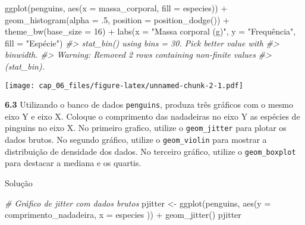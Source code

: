 \documentclass[
]{book}
\newenvironment{Shaded}{\begin{snugshade}}{\end{snugshade}}
\newcommand{\AttributeTok}[1]{\textcolor[rgb]{0.77,0.63,0.00}{#1}}
\newcommand{\CommentTok}[1]{\textcolor[rgb]{0.56,0.35,0.01}{\textit{#1}}}
\newcommand{\DecValTok}[1]{\textcolor[rgb]{0.00,0.00,0.81}{#1}}
\newcommand{\FunctionTok}[1]{\textcolor[rgb]{0.00,0.00,0.00}{#1}}
\newcommand{\NormalTok}[1]{#1}
\newcommand{\OtherTok}[1]{\textcolor[rgb]{0.56,0.35,0.01}{#1}}
\newcommand{\SpecialCharTok}[1]{\textcolor[rgb]{0.00,0.00,0.00}{#1}}
\newcommand{\StringTok}[1]{\textcolor[rgb]{0.31,0.60,0.02}{#1}}
\begin{document}
\begin{Shaded}
\begin{Highlighting}[]
\FunctionTok{ggplot}\NormalTok{(penguins, }\FunctionTok{aes}\NormalTok{(}\AttributeTok{x =}\NormalTok{ massa\_corporal, }\AttributeTok{fill =}\NormalTok{ especies)) }\SpecialCharTok{+}
  \FunctionTok{geom\_histogram}\NormalTok{(}\AttributeTok{alpha =}\NormalTok{ .}\DecValTok{5}\NormalTok{,  }\AttributeTok{position =} \FunctionTok{position\_dodge}\NormalTok{()) }\SpecialCharTok{+}
  \FunctionTok{theme\_bw}\NormalTok{(}\AttributeTok{base\_size =} \DecValTok{16}\NormalTok{) }\SpecialCharTok{+}
  \FunctionTok{labs}\NormalTok{(}\AttributeTok{x =} \StringTok{"Massa corporal (g)"}\NormalTok{,}
       \AttributeTok{y =} \StringTok{"Frequência"}\NormalTok{,}
       \AttributeTok{fill =} \StringTok{"Espécie"}\NormalTok{)}
\CommentTok{\#\textgreater{} \textasciigrave{}stat\_bin()\textasciigrave{} using \textasciigrave{}bins = 30\textasciigrave{}. Pick better value with}
\CommentTok{\#\textgreater{} \textasciigrave{}binwidth\textasciigrave{}.}
\CommentTok{\#\textgreater{} Warning: Removed 2 rows containing non{-}finite values}
\CommentTok{\#\textgreater{} (stat\_bin).}
\end{Highlighting}
\end{Shaded}

\texttt{[image: cap\_06\_files/figure-latex/unnamed-chunk-2-1.pdf]}

\textbf{6.3}
Utilizando o banco de dados \texttt{penguins}, produza três gráficos com o mesmo eixo Y e eixo X. Coloque o comprimento das nadadeiras no eixo Y as espécies de pinguins no eixo X. No primeiro grafico, utilize o \texttt{geom\_jitter} para plotar os dados brutos. No segundo gráfico, utilize o \texttt{geom\_violin} para mostrar a distribuição de densidade dos dados. No terceiro gráfico, utilize o \texttt{geom\_boxplot} para destacar a mediana e os quartis.

Solução

\begin{Shaded}
\begin{Highlighting}[]
\CommentTok{\# Gráfico de jitter com dados brutos}
\NormalTok{pjitter }\OtherTok{\textless{}{-}} \FunctionTok{ggplot}\NormalTok{(penguins, }\FunctionTok{aes}\NormalTok{(}\AttributeTok{y =}\NormalTok{ comprimento\_nadadeira, }\AttributeTok{x =}\NormalTok{ especies )) }\SpecialCharTok{+}
  \FunctionTok{geom\_jitter}\NormalTok{()}
\NormalTok{pjitter}
\end{Highlighting}
\end{Shaded}
\end{document}
